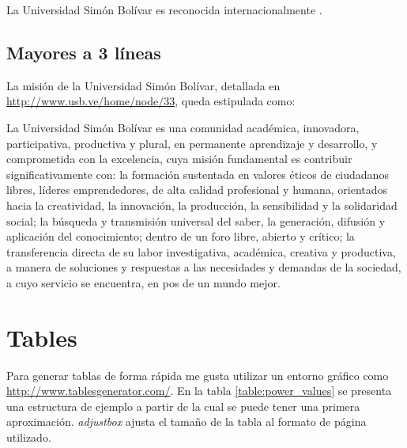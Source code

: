 La Universidad Simón Bolívar es reconocida internacionalmente .

\subsection{Mayores a 3 líneas}

La misión de la Universidad Simón Bolívar, detallada en \url{http://www.usb.ve/home/node/33}, queda estipulada como:

\begin{displayquote}
La Universidad Simón Bolívar es una comunidad académica, innovadora, participativa, productiva y plural, en permanente aprendizaje y desarrollo, y comprometida con la excelencia, cuya misión fundamental es contribuir significativamente con: la formación sustentada en valores éticos de ciudadanos libres, líderes emprendedores, de alta calidad profesional y humana, orientados hacia la creatividad, la innovación, la producción, la sensibilidad y la solidaridad social; la búsqueda y transmisión universal del saber, la generación, difusión y aplicación del conocimiento; dentro de un foro libre, abierto y crítico; la transferencia directa de su labor investigativa, académica, creativa y productiva, a manera de soluciones y respuestas a las necesidades y demandas de la sociedad, a cuyo servicio se encuentra, en pos de un mundo mejor.
\end{displayquote}

\section{Tables}

Para generar tablas de forma rápida me gusta utilizar un entorno gráfico como \url{http://www.tablesgenerator.com/}. En la tabla \ref{table:power_values} se presenta una estructura de ejemplo a partir de la cual se puede tener una primera aproximación. \textit{adjustbox} ajusta el tamaño de la tabla al formato de página utilizado.

